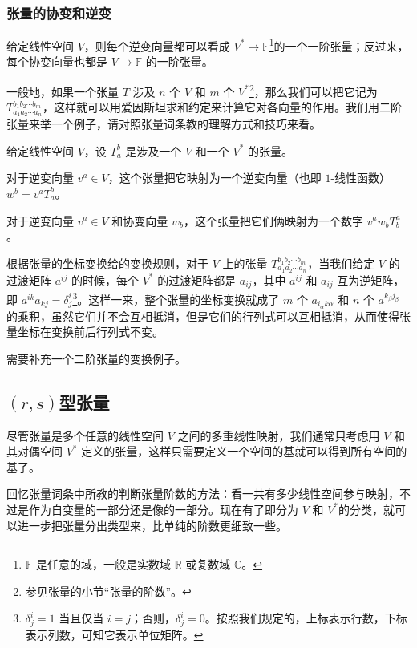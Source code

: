 \subsubsection{张量的协变和逆变}

给定线性空间 $V$，则每个逆变向量都可以看成 $V^*\rightarrow \mathbb{F}$\footnote{$\mathbb{F}$ 是任意的域，一般是实数域 $\mathbb{R}$ 或复数域 $\mathbb{C}$。}的一个一阶张量；反过来，每个协变向量也都是 $V\rightarrow \mathbb{F}$ 的一阶张量。

一般地，如果一个张量 $T$ 涉及 $n$ 个 $V$ 和 $m$ 个 $V^*$\footnote{参见张量的小节“张量的阶数”。}，那么我们可以把它记为 $T^{b_1b_2\cdots b_m}_{a_1a_2\cdots a_n}$，这样就可以用爱因斯坦求和约定来计算它对各向量的作用。我们用二阶张量来举一个例子，请对照张量词条教的理解方式和技巧来看。

\begin{example}{}
给定线性空间 $V$，设 $T^b_a$ 是涉及一个 $V$ 和一个 $V^*$ 的张量。

对于逆变向量 $v^a\in V$，这个张量把它映射为一个逆变向量（也即 $1$-线性函数）$w^b=v^aT^b_a$。

对于逆变向量 $v^a\in V$ 和协变向量 $w_b$，这个张量把它们俩映射为一个数字 $v^aw_bT^a_b$。
\end{example}

根据张量的坐标变换给的变换规则，对于 $V$ 上的张量 $T^{b_1b_2\cdots b_m}_{a_1a_2\cdots a_n}$，当我们给定 $V$ 的过渡矩阵 $a^{ij}$ 的时候，每个 $V^*$ 的过渡矩阵都是 $a_{ij}$，其中 $a^{ij}$ 和 $a_{ij}$ 互为逆矩阵，即 $a^{ik}a_{kj}=\delta^i_j$\footnote{$\delta^i_j=1$ 当且仅当 $i=j$；否则，$\delta^i_j=0$。按照我们规定的，上标表示行数，下标表示列数，可知它表示单位矩阵。}。这样一来，整个张量的坐标变换就成了 $m$ 个 $a_{i_\alpha k\alpha}$ 和 $n$ 个 $a^{k_\beta j_\beta}$ 的乘积，虽然它们并不会互相抵消，但是它们的行列式可以互相抵消，从而使得张量坐标在变换前后行列式不变。


\begin{issues}
需要补充一个二阶张量的变换例子。
\end{issues}


\subsection{$(r, s)$型张量}


尽管张量是多个任意的线性空间 $V$ 之间的多重线性映射，我们通常只考虑用 $V$ 和其对偶空间 $V^*$ 定义的张量，这样只需要定义一个空间的基就可以得到所有空间的基了。

回忆张量词条中所教的判断张量阶数的方法：看一共有多少线性空间参与映射，不过是作为自变量的一部分还是像的一部分。现在有了即分为 $V$ 和 $V^*$的分类，就可以进一步把张量分出类型来，比单纯的阶数更细致一些。

